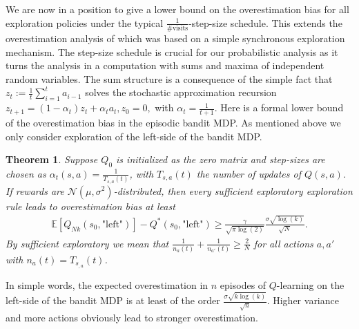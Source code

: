 \documentclass{article}
\newcommand{\E}{\mathbb{E}}
\theoremstyle{plain}
\newtheorem{theorem}{Theorem}[section]
\theoremstyle{definition}
\theoremstyle{remark}
\begin{document}
We are now in a position to give a lower bound on the overestimation bias for all exploration policies under the typical $\frac{1}{\# \text{visits}}$-step-size schedule. This extends the overestimation analysis of \cite{VanHasselt:2011} which was based on a simple synchronous exploration mechanism. The step-size schedule is crucial for our probabilistic analysis as it turns the analysis in a computation with sums and maxima of independent random variables. The sum structure is a consequence of the simple fact that $z_t:=\frac{1}{t} \sum_{i=1}^t a_{i-1}$ solves the stochastic approximation recursion $z_{t+1}=(1-\alpha_t)z_t+ \alpha_t a_t, z_0=0,$ with $\alpha_t=\frac{1}{t+1}$. Here is a formal lower bound of the overestimation bias in the episodic bandit MDP. As mentioned above we only consider exploration of the left-side of the bandit MDP.
\begin{theorem}\label{thm:1}
    Suppose $Q_0$ is initialized as the zero matrix and step-sizes are chosen as  $\alpha_t(s,a)=\frac{1}{T_{s,a}(t)}$, with $T_{s,a}(t)$ the number of updates of $Q(s,a)$. If rewards are $\mathcal N(\mu,\sigma^2)$-distributed, then every sufficient exploratory exploration rule leads to overestimation bias at least 
    \begin{align*}
        \E[Q_{Nk}(s_0,\text{"left"})]- Q^*(s_0,\text{"left"})\geq\frac{\gamma}{\sqrt{\pi\log(2) }}\frac{\sigma \sqrt{\log(k)}}{\sqrt{N}}.
    \end{align*}
    By sufficient exploratory we mean that $\frac{1}{n_a(t)}+\frac{1}{n_{a'}(t)}
\geq \frac{2}{N}$ for all actions $a,a'$ with $n_a(t)=T_{s_{,a}}(t)$.
\end{theorem}
In simple words, the expected overestimation in $n$ episodes of $Q$-learning on the left-side of the bandit MDP is at least of the order $\frac{\sigma \sqrt{k\log(k)}}{\sqrt{n}}$. Higher variance and more actions obviously lead to stronger overestimation. 
\end{document}
